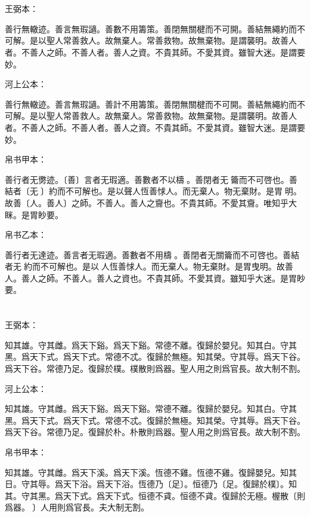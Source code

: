 \documentclass[a5paper]{ctexbook}
\begin{document}
    \chapter{}
    王弼本：

    善行無轍迹。善言無瑕讁。善數不用籌策。善閉無關楗而不可開。善結無繩約而不可解。是以聖人常善救人。故無棄人。常善救物。故無棄物。是謂襲明。故善人者。不善人之師。不善人者。善人之資。不貴其師。不愛其資。雖智大迷。是謂要妙。

    河上公本：

    善行無轍迹。善言無瑕讁。善計不用籌策。善閉無關楗而不可開。善結無繩約而不可解。是以聖人常善救人。故無棄人。常善救物。故無棄物。是謂襲明。故善人者。不善人之師。不善人者。善人之資。不貴其師。不愛其資。雖智大迷。是謂要妙。

    帛书甲本：

    善行者无勶迹。〔善〕言者无瑕適。善數者不以檮𥮥。善閉者无󱁥籥而不可啓也。善結者〔无𦄿〕約而不可解也。是以聲人恆善㤹人。而无棄人。物无棄財。是胃𢘽明。故善〔人。善人〕之師。不善人。善人之齎也。不貴其師。不愛其齎。唯知乎大眯。是胃眇要。

    帛书乙本：

    善行者无達迹。善言者无瑕適。善數者不用檮󱁦。善閉者无關籥而不可啓也。善結者无𦄿約而不可解也。是以𦔻人恆善㤹人。而无棄人。物无棄財。是胃曳明。故善人。善人之師。不善人。善人之資也。不貴其師。不愛其資。雖知乎大迷。是胃眇要。

    \chapter{}
    王弼本：

    知其雄。守其雌。爲天下谿。爲天下谿。常德不離。復歸於嬰兒。知其白。守其黑。爲天下式。爲天下式。常德不忒。復歸於無極。知其榮。守其辱。爲天下谷。爲天下谷。常德乃足。復歸於樸。樸散則爲器。聖人用之則爲官長。故大制不割。

    河上公本：

    知其雄。守其雌。爲天下谿。爲天下谿。常德不離。復歸於嬰兒。知其白。守其黑。爲天下式。爲天下式。常德不忒。復歸於無極。知其榮。守其辱。爲天下谷。爲天下谷。常德乃足。復歸於朴。朴散則爲器。聖人用之則爲官長。故大制不割。

    帛书甲本：

    知其雄。守其雌。爲天下溪。爲天下溪。恆德不雞。恆德不雞。復歸嬰兒。知其日。守其辱。爲天下浴。爲天下浴。恆德乃〔足〕。恒德乃〔足。復歸於樸〕。知其。守其黑。爲天下式。爲天下式。恒德不貣。恒德不貣。復歸於无極。楃散〔則爲器。𦔻〕人用則爲官長。夫大制无割。
\end{document}
